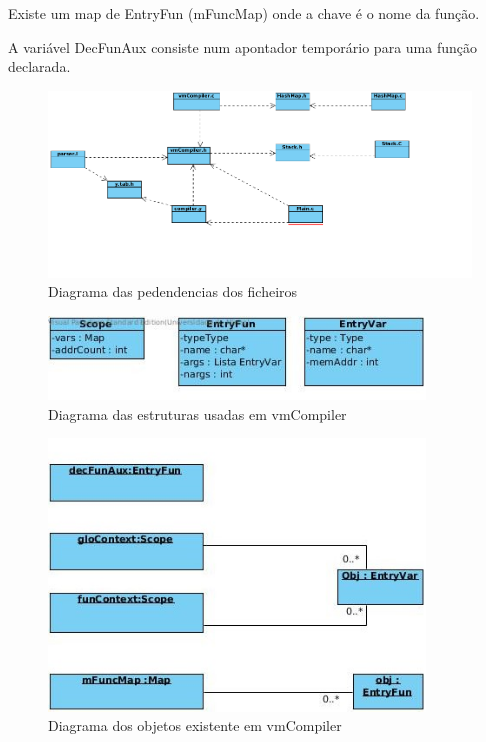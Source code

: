 \documentclass[a4paper,10pt]{report}
\begin{document}
    Existe um map de EntryFun (mFuncMap) onde a chave é o nome da função.
    
    A variável DecFunAux consiste num apontador temporário para uma função declarada.

\begin{figure}
\centering
\includegraphics[width=15cm]{imagens/dependecias.png}
\caption{Diagrama das pedendencias dos ficheiros}
\label{fig:dependencias}
\end{figure}

\begin{figure}
\centering
\includegraphics[width=10cm]{imagens/estruturas.jpg}
\caption{Diagrama das estruturas usadas em vmCompiler}
\label{fig:struct}
\end{figure}

\begin{figure}
\centering
\includegraphics[width=10cm]{imagens/objetos.jpg}
\caption{Diagrama dos objetos existente em vmCompiler}
\label{fig:objs}
\end{figure}
\end{document}

